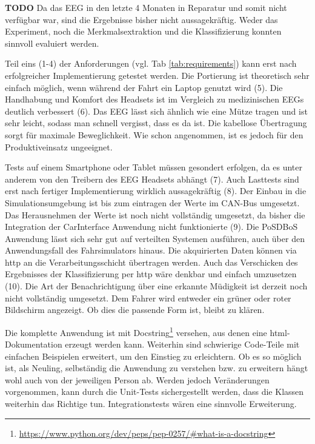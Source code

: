 \label{chap:result}
\textbf{TODO}
Da das EEG in den letzte 4 Monaten in Reparatur und somit nicht verfügbar war, sind die Ergebnisse bisher nicht aussagekräftig. Weder das Experiment, noch die Merkmalsextraktion und die Klassifizierung konnten sinnvoll evaluiert werden. 

Teil eins (1-4) der Anforderungen (vgl. Tab \ref{tab:requirements}) kann erst nach erfolgreicher Implementierung getestet werden. Die Portierung ist theoretisch sehr einfach möglich, wenn während der Fahrt ein Laptop genutzt wird (5). Die Handhabung und Komfort des Headsets ist im Vergleich zu medizinischen EEGs deutlich verbessert (6). Das EEG lässt sich ähnlich wie eine Mütze tragen und ist sehr leicht, sodass man schnell vergisst, dass es da ist. Die kabellose Übertragung sorgt für maximale Beweglichkeit. Wie schon angenommen, ist es jedoch für den Produktiveinsatz ungeeignet.

Tests auf einem Smartphone oder Tablet müssen gesondert erfolgen, da es unter anderem von den Treibern des EEG Headsets abhängt (7). Auch Lasttests sind erst nach fertiger Implementierung wirklich aussagekräftig (8). Der Einbau in die Simulationsumgebung ist bis zum eintragen der Werte im CAN-Bus umgesetzt. Das Herausnehmen der Werte ist noch nicht vollständig umgesetzt, da bisher die Integration der CarInterface Anwendung nicht funktionierte (9). Die PoSDBoS Anwendung lässt sich sehr gut auf verteilten Systemen ausführen, auch über den Anwendungsfall des Fahrsimulators hinaus. Die akquirierten Daten können via http an die Verarbeitungsschicht übertragen werden. Auch das Verschicken des Ergebnisses der Klassifizierung per http wäre denkbar und einfach umzusetzen (10). Die Art der Benachrichtigung über eine erkannte Müdigkeit ist derzeit noch nicht vollständig umgesetzt. Dem Fahrer wird entweder ein grüner oder roter Bildschirm angezeigt. Ob dies die passende Form ist, bleibt zu klären.

Die komplette Anwendung ist mit Docstring\footnote{\url{https://www.python.org/dev/peps/pep-0257/\#what-is-a-docstring}} versehen, aus denen eine html-Dokumentation erzeugt werden kann. Weiterhin sind schwierige Code-Teile mit einfachen Beispielen erweitert, um den Einstieg zu erleichtern. Ob es so möglich ist, als Neuling, selbständig die Anwendung zu verstehen bzw. zu erweitern hängt wohl auch von der jeweiligen Person ab. Werden jedoch Veränderungen vorgenommen, kann durch die Unit-Tests sichergestellt werden, dass die Klassen weiterhin das Richtige tun. Integrationstests wären eine sinnvolle  Erweiterung.